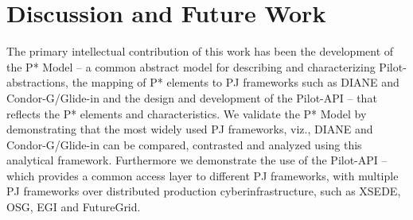 \documentclass[conference]{IEEEtran}
\begin{document}


% 
% 



\section{Discussion and Future Work}
\label{sec:discussion-future-work}



The primary intellectual contribution of this work has been the
development of the P* Model -- a common abstract model for describing
and characterizing Pilot-abstractions, the mapping of P* elements to
PJ frameworks such as DIANE and Condor-G/Glide-in and the design and
development of the Pilot-API -- that reflects the P* elements and
characteristics.  We validate the P* Model by demonstrating that the
most widely used PJ frameworks, viz., DIANE and Condor-G/Glide-in can
be compared, contrasted and analyzed using this analytical framework.
Furthermore we demonstrate the use of the Pilot-API -- which provides
a common access layer to different PJ frameworks, with multiple PJ
frameworks over distributed production cyberinfrastructure, such as
XSEDE, OSG, EGI and FutureGrid. 
\end{document}
